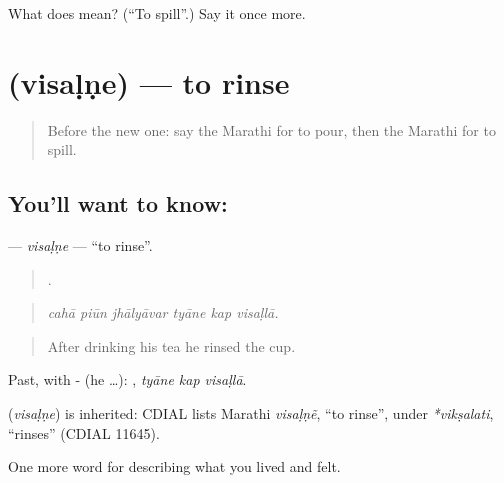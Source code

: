 \begin{tcolorbox}[breakable,colback=teal!4,colframe=teal!35!black,title={Before you move on}]
What does  mean? (\textquotedblleft{}To spill\textquotedblright{}.) Say it once more.
\end{tcolorbox}
\section[\texorpdfstring{\mr{विसळणे} (visaḷṇe)}{विसळणे (visaḷṇe)}]{ (visaḷṇe) — to rinse}

\label{lesson:MR-C525-visalne}



\begin{quote}
Before the new one: say the Marathi for to pour, then the Marathi for to spill.
\end{quote}

\subsection*{You'll want to know: }
\textbf{} — \emph{visaḷṇe} — \textquotedblleft{}to rinse\textquotedblright{}.

\begin{quote}
     .
\end{quote}

\begin{quote}
\emph{cahā piūn jhālyāvar tyāne kap visaḷlā.}
\end{quote}

\begin{quote}
After drinking his tea he rinsed the cup.
\end{quote}

Past, with - (he …):   , \emph{tyāne kap visaḷlā}.

\begin{cousinweb}
\textbf{} (\emph{visaḷṇe}) is inherited: CDIAL lists Marathi \emph{visaḷṇẽ}, \textquotedblleft{}to rinse\textquotedblright{}, under \emph{*vikṣalati}, \textquotedblleft{}rinses\textquotedblright{} (CDIAL 11645).
\end{cousinweb}

\begin{grammarlens}[title={What you've built}]
One more word for describing what you lived and felt.
\end{grammarlens}

